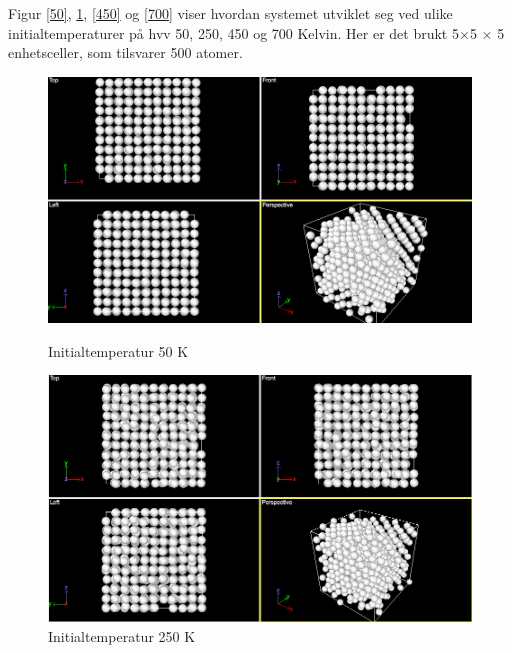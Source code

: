 \documentclass[paper=a4, fontsize=11pt]{scrartcl} %
\numberwithin{equation}{section} %
\numberwithin{figure}{section} %
\numberwithin{table}{section} %
\begin{document}
Figur \ref{50}, \ref{250}, \ref{450} og \ref{700} viser hvordan systemet utviklet seg ved ulike initialtemperaturer på hvv 50, 250, 450 og 700 Kelvin. Her er det brukt 5$\times$5 $\times$ 5 enhetsceller, som tilsvarer 500 atomer. 
 
 
 \FloatBarrier
\begin{figure}[!htb]
  \includegraphics[width=\linewidth]{T=50}
  \caption{Initialtemperatur 50 K}\label{50}
\endminipage\hfill
{}
  \includegraphics[width=\linewidth]{T=250}
  \caption{Initialtemperatur 250 K}\label{250}
\endminipage\hfill
\end{figure}
 \FloatBarrier
 
\end{document}
